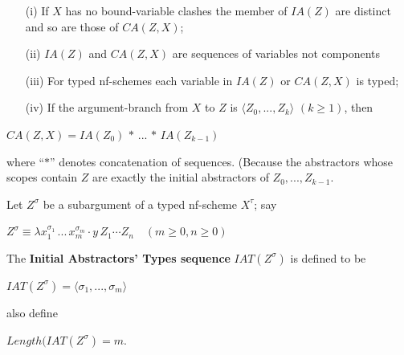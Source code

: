 \documentclass[a4paper,10pt]{article}
\begin{document}
\begin{note}\label{8E5.1}
\begin{itemize}
 \item[(i)] If $X$ has no bound-variable clashes the member of $IA(Z)$ are distinct and so are those of $CA(Z,X)$;
 \item[(ii)] $IA(Z)$ and $CA(Z,X)$ are sequences of variables not components
 \item[(iii)] For typed nf-schemes each variable in $IA(Z)$ or $CA(Z,X)$ is typed;
 \item[(iv)] If the argument-branch from $X$ to $Z$ is $\langle Z_0, ..., Z_k\rangle\,\,(k \geq 1)$, then 
\end{itemize}
\begin{center}
 $CA(Z,X) = IA(Z_0)\,*\,...\,*\,IA(Z_{k-1})$
\end{center}
where ``$*$'' denotes concatenation of sequences. (Because the abstractors whose scopes contain $Z$ are exactly the initial abstractors of 
$Z_0, ..., Z_{k - 1}$.
\end{note}


\begin{mydef}[$IAT$] Let $Z^{\sigma}$ be a subargument of a typed nf-scheme $X^{\tau}$; say
 \begin{center}
  $Z^{\sigma} \equiv \lambda x_1^{\sigma_1}\,...\,x_m^{\sigma_m}\cdot y\,Z_1\cdots Z_n\,\,\,\,\,\, (m \geq 0, n \geq 0)$
 \end{center}
 The \textbf{Initial Abstractors' Types sequence} $IAT(Z^{\sigma})$ is defined to be
 \begin{center}
  $IAT(Z^{\sigma}) = \langle\sigma_1, ...,\sigma_m\rangle$
 \end{center}
 also define
 \begin{center}
  $Length(IAT(Z^{\sigma}) = m$. 
 \end{center}
\end{mydef}
\end{document}

